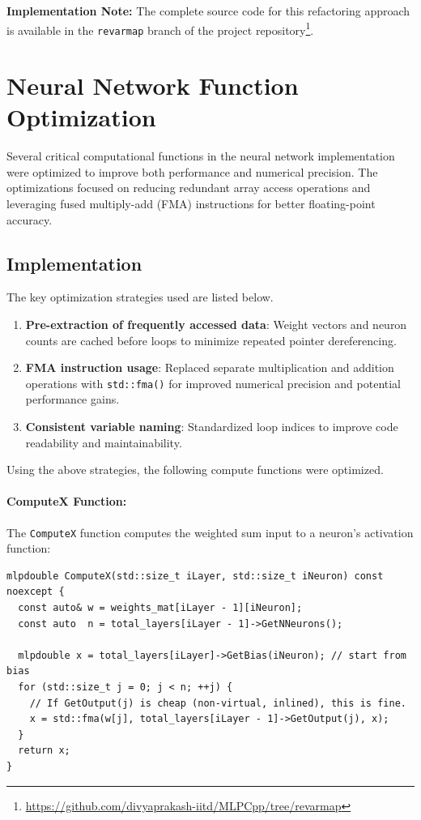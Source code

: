 \documentclass{article}
\begin{document}
\noindent\textbf{Implementation Note:} The complete source code for this refactoring approach is available in the \texttt{revarmap} branch of the project repository\footnote{\url{https://github.com/divyaprakash-iitd/MLPCpp/tree/revarmap}}.

\section{Neural Network Function Optimization}

Several critical computational functions in the neural network implementation were optimized to improve both performance and numerical precision. The optimizations focused on reducing redundant array access operations and leveraging fused multiply-add (FMA) instructions for better floating-point accuracy.

\subsection{Implementation}
The key optimization strategies used are listed below.
\begin{enumerate}
  \item \textbf{Pre-extraction of frequently accessed data}: Weight vectors and neuron counts are cached before loops to minimize repeated pointer dereferencing.
  \item \textbf{FMA instruction usage}: Replaced separate multiplication and addition operations with \texttt{std::fma()} for improved numerical precision and potential performance gains.
  \item \textbf{Consistent variable naming}: Standardized loop indices to improve code readability and maintainability.
\end{enumerate}

Using the above strategies, the following compute functions were optimized. 

\paragraph{ComputeX Function:}
The \texttt{ComputeX} function computes the weighted sum input to a neuron's activation function:

\begin{verbatim}
mlpdouble ComputeX(std::size_t iLayer, std::size_t iNeuron) const noexcept {
  const auto& w = weights_mat[iLayer - 1][iNeuron];
  const auto  n = total_layers[iLayer - 1]->GetNNeurons();

  mlpdouble x = total_layers[iLayer]->GetBias(iNeuron); // start from bias
  for (std::size_t j = 0; j < n; ++j) {
    // If GetOutput(j) is cheap (non-virtual, inlined), this is fine.
    x = std::fma(w[j], total_layers[iLayer - 1]->GetOutput(j), x);
  }
  return x;
}
\end{verbatim}
\end{document}
